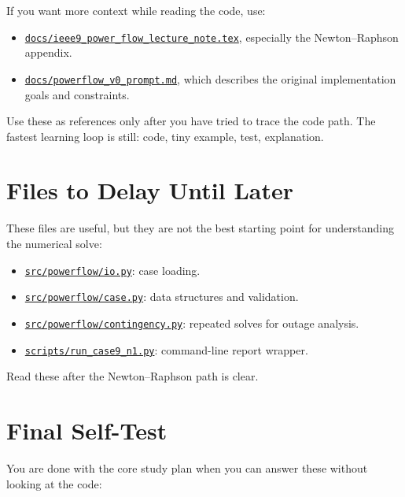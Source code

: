 \documentclass[11pt]{article}
\newcommand{\code}[1]{\texttt{#1}}
\begin{document}
If you want more context while reading the code, use:

\begin{itemize}
  \item \href{ieee9_power_flow_lecture_note.tex}{\code{docs/ieee9\_power\_flow\_lecture\_note.tex}},
  especially the Newton--Raphson appendix.
  \item \href{powerflow_v0_prompt.md}{\code{docs/powerflow\_v0\_prompt.md}},
  which describes the original implementation goals and constraints.
\end{itemize}

Use these as references only after you have tried to trace the code path. The
fastest learning loop is still: code, tiny example, test, explanation.

\section{Files to Delay Until Later}

These files are useful, but they are not the best starting point for
understanding the numerical solve:

\begin{itemize}
  \item \href{../src/powerflow/io.py}{\code{src/powerflow/io.py}}: case loading.
  \item \href{../src/powerflow/case.py}{\code{src/powerflow/case.py}}: data
  structures and validation.
  \item \href{../src/powerflow/contingency.py}{\code{src/powerflow/contingency.py}}:
  repeated solves for outage analysis.
  \item \href{../scripts/run_case9_n1.py}{\code{scripts/run\_case9\_n1.py}}:
  command-line report wrapper.
\end{itemize}

Read these after the Newton--Raphson path is clear.

\section{Final Self-Test}

You are done with the core study plan when you can answer these without looking
at the code:
\end{document}
